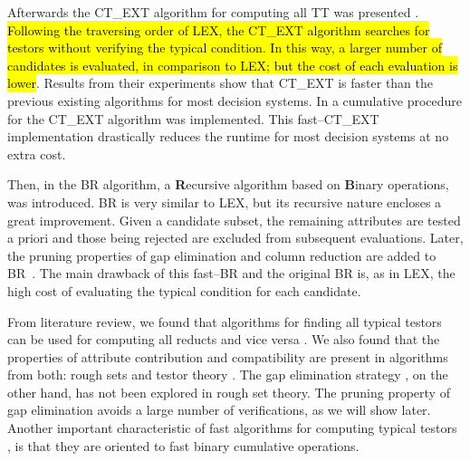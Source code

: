 \documentclass[number,preprint,review,12pt]{elsarticle}
\begin{document}
  Afterwards the CT\_EXT algorithm for computing all TT was presented \cite{Sanchez07}. \hl{Following the traversing order of LEX, the CT\_EXT algorithm searches for testors without verifying the typical condition. In this way, a larger number of candidates is evaluated, in comparison to LEX; but the cost of each evaluation is lower}. Results from their experiments show that CT\_EXT is faster than the previous existing algorithms for most decision systems. In \cite{Sanchez10} a cumulative procedure for the CT\_EXT algorithm was implemented. This fast--CT\_EXT implementation drastically reduces the runtime for most decision systems at no extra cost.
  
  Then, in \cite{Lias09} the BR algorithm, a \textbf{R}ecursive algorithm based on \textbf{B}inary operations, was introduced. BR is very similar to LEX, but its recursive nature encloses a great improvement. Given a candidate subset, the remaining attributes are tested a priori and those being rejected are excluded from subsequent evaluations. Later, the pruning properties of gap elimination and column reduction are added to BR~\citep{Lias13}. The main drawback of this fast--BR and the original BR is, as in LEX, the high cost of evaluating the typical condition for each candidate.
  
  
  From literature review, we found that algorithms for finding all typical testors can be used for computing all reducts and vice versa \citep{Lazo15}. We also found that the properties of attribute contribution and compatibility are present in algorithms from both: rough sets \citep{WangP07} and testor theory \citep{Sanchez10,Lias13}. The gap elimination strategy \citep{Santiesteban03,Lias13}, on the other hand, has not been explored in rough set theory. The pruning property of gap elimination avoids a large number of verifications, as we will show later. Another important characteristic of fast algorithms for computing typical testors \citep{Sanchez10,Lias13}, is that they are oriented to fast binary cumulative operations. 
  
\end{document}
